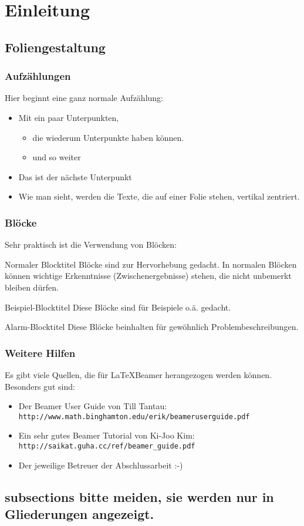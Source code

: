 \section{Einleitung}

\subsection{Foliengestaltung}

\begin{frame}
  \frametitle{Aufz\"ahlungen}
  Hier beginnt eine ganz normale Aufzählung:
  \begin{itemize}
    \item Mit ein paar Unterpunkten,
    \begin{itemize}
      \item die wiederum Unterpunkte haben können.
      \item und so weiter
    \end{itemize}
    \item Das ist der nächste Unterpunkt
    \item Wie man sieht, werden die Texte, die auf einer Folie stehen, vertikal zentriert.
  \end{itemize}
\end{frame}


\begin{frame}
  \frametitle{Blöcke}

  Sehr praktisch ist die Verwendung von Blöcken:
  \begin{block}{Normaler Blocktitel}
    Blöcke sind zur Hervorhebung gedacht. In normalen Blöcken können
    wichtige Erkenntnisse (Zwischenergebnisse) stehen, die nicht
    unbemerkt bleiben dürfen.
  \end{block}

  \begin{exampleblock}{Beispiel-Blocktitel}
    Diese Blöcke sind für Beispiele o.ä. gedacht.
  \end{exampleblock}

  \begin{alertblock}{Alarm-Blocktitel}
    Diese Blöcke beinhalten für gewöhnlich Problembeschreibungen.
  \end{alertblock}
\end{frame}

\begin{frame}
  \frametitle{Weitere Hilfen}

  Es gibt viele Quellen, die für \LaTeX Beamer herangezogen werden können. Besonders gut sind:
  \begin{itemize}
    \item Der Beamer User Guide von Till Tantau:\\\texttt{http://www.math.binghamton.edu/erik/beameruserguide.pdf}
    \item Ein sehr gutes Beamer Tutorial von Ki-Joo Kim:\\\texttt{http://saikat.guha.cc/ref/beamer\_guide.pdf}
    \item Der jeweilige Betreuer der Abschlussarbeit :-)
  \end{itemize}

\end{frame}

\subsection{subsections bitte meiden, sie werden nur in Gliederungen angezeigt.}

